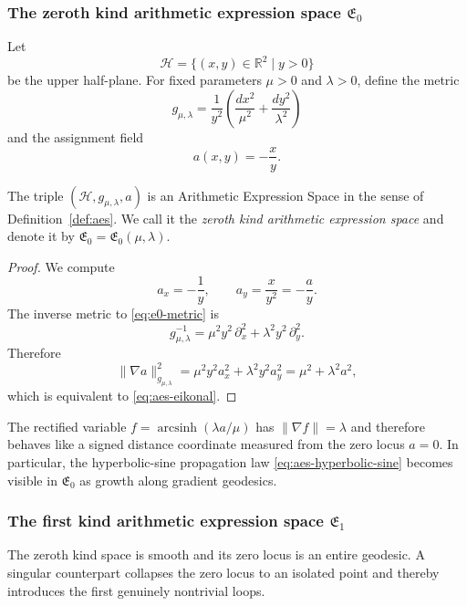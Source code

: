 \subsubsection*{The zeroth kind arithmetic expression space \texorpdfstring{$\mathfrak{E}_0$}{E0}}
Let
\[
\mathcal{H}=\{(x,y)\in\mathbb{R}^2\mid y>0\}
\]
be the upper half-plane. For fixed parameters $\mu>0$ and $\lambda>0$, define the metric
\begin{equation}\label{eq:e0-metric}
g_{\mu,\lambda}=\frac{1}{y^2}\left(\frac{dx^2}{\mu^2}+\frac{dy^2}{\lambda^2}\right)
\end{equation}
and the assignment field
\begin{equation}\label{eq:e0-assignment}
a(x,y)=-\frac{x}{y}.
\end{equation}

\begin{theorem}\label{thm:aes-e0}
The triple $(\mathcal{H},g_{\mu,\lambda},a)$ is an Arithmetic Expression Space in the sense of Definition~\ref{def:aes}. We call it the \emph{zeroth kind arithmetic expression space} and denote it by $\mathfrak{E}_0=\mathfrak{E}_0(\mu,\lambda)$.
\end{theorem}

\begin{proof}
We compute
\[
a_x=-\frac{1}{y},
\qquad
a_y=\frac{x}{y^2}=-\frac{a}{y}.
\]
The inverse metric to \eqref{eq:e0-metric} is
\[
g_{\mu,\lambda}^{-1}=\mu^2 y^2\,\partial_x^2+\lambda^2 y^2\,\partial_y^2.
\]
Therefore
\[
\|\nabla a\|_{g_{\mu,\lambda}}^2
=\mu^2 y^2 a_x^2+\lambda^2 y^2 a_y^2
=\mu^2+\lambda^2 a^2,
\]
which is equivalent to \eqref{eq:aes-eikonal}.
\end{proof}

The rectified variable $f=\operatorname{arcsinh}(\lambda a/\mu)$ has $\|\nabla f\|=\lambda$ and therefore behaves like a signed distance coordinate measured from the zero locus $a=0$. In particular, the hyperbolic-sine propagation law \eqref{eq:aes-hyperbolic-sine} becomes visible in $\mathfrak{E}_0$ as growth along gradient geodesics.

\subsubsection*{The first kind arithmetic expression space \texorpdfstring{$\mathfrak{E}_1$}{E1}}
The zeroth kind space is smooth and its zero locus is an entire geodesic. A singular counterpart collapses the zero locus to an isolated point and thereby introduces the first genuinely nontrivial loops.

